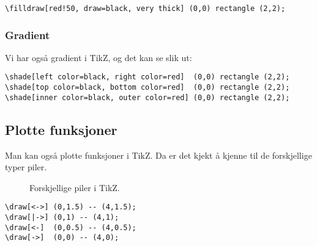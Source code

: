 \documentclass[11pt, a4paper]{article}
\begin{document}
\begin{center}
\end{center}

\begin{Verbatim}[fontsize=\small]
\filldraw[red!50, draw=black, very thick] (0,0) rectangle (2,2);
\end{Verbatim}

\subsubsection{Gradient}
\noindent Vi har også gradient i TikZ, og det kan se slik ut:

\begin{center}
\end{center}

\begin{Verbatim}[fontsize=\small]
\shade[left color=black, right color=red]  (0,0) rectangle (2,2);
\shade[top color=black, bottom color=red]  (0,0) rectangle (2,2);
\shade[inner color=black, outer color=red] (0,0) rectangle (2,2);
\end{Verbatim}

\newpage


\subsection{Plotte funksjoner}
Man kan også plotte funksjoner i TikZ. Da er det kjekt å kjenne til de forskjellige typer piler.

\begin{figure}[h!]
\centering
{}
\caption{Forskjellige piler i TikZ.}
\end{figure}

\begin{Verbatim}[fontsize=\small, frame=single]
\draw[<->] (0,1.5) -- (4,1.5);
\draw[|->] (0,1) -- (4,1);
\draw[<-]  (0,0.5) -- (4,0.5);
\draw[->]  (0,0) -- (4,0);
\end{Verbatim}
\end{document}
